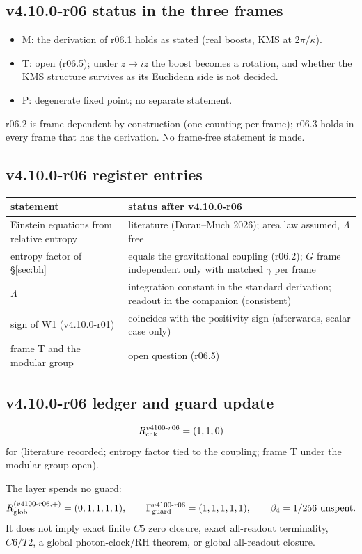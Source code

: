 \subsection*{v4.10.0-r06 status in the three frames}
\label{subsec:v4100-r06-frames}

\begin{itemize}[leftmargin=2em]
\item M: the derivation of r06.1 holds as stated (real boosts, KMS at \(2\pi/\kappa\)).
\item T: open (r06.5); under \(z\mapsto iz\) the boost becomes a rotation, and whether the KMS structure survives as its Euclidean side is not decided.
\item P: degenerate fixed point; no separate statement.
\end{itemize}
r06.2 is frame dependent by construction (one counting per frame); r06.3 holds in every frame that has the derivation.  No frame-free statement is made.

\subsection*{v4.10.0-r06 register entries}
\label{subsec:v4100-r06-register}

\begin{center}
\small
\begin{tabular}{@{}>{\raggedright\arraybackslash}p{}>{\raggedright\arraybackslash}p{}@{}}
\toprule
statement & status after v4.10.0-r06\\
\midrule
Einstein equations from relative entropy & literature (Dorau--Much 2026); area law assumed, \(\Lambda\) free\\
entropy factor of \S\ref{sec:bh} & equals the gravitational coupling (r06.2); \(G\) frame independent only with matched \(\gamma\) per frame\\
\(\Lambda\) & integration constant in the standard derivation; readout in the companion (consistent)\\
sign of W1 (v4.10.0-r01) & coincides with the positivity sign (afterwards, scalar case only)\\
frame T and the modular group & open question (r06.5)\\
\bottomrule
\end{tabular}
\end{center}

\subsection*{v4.10.0-r06 ledger and guard update}
\label{subsec:v4100-r06-ledger-guard}

\[
R_{\rm chk}^{v4100\text{-}r06}=(1,1,0)
\]
for (literature recorded; entropy factor tied to the coupling; frame T under the modular group open).

The layer spends no guard:
\[
R_{\rm glob}^{(v4100\text{-}r06,+)}=(0,1,1,1,1),
\qquad
\Gamma_{\rm guard}^{v4100\text{-}r06}=(1,1,1,1,1),
\qquad
\beta_4=1/256\ \text{unspent}.
\]
It does not imply exact finite \(C5\) zero closure, exact all-readout terminality,
\(C6/T2\), a global photon-clock/RH theorem, or global all-readout closure.
